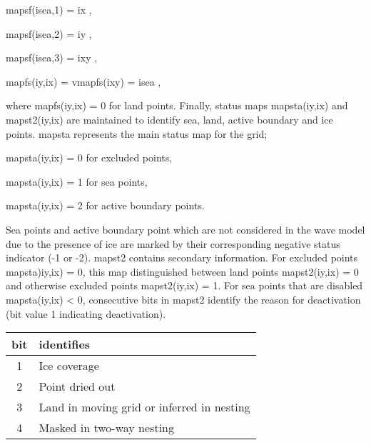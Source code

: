 \vspace{\baselineskip}
\centerline{\F mapsf(isea,1) = ix ,}
\centerline{\F mapsf(isea,2) = iy ,}
\centerline{\F mapsf(isea,3) = ixy ,}
\centerline{\F mapfs(iy,ix) = vmapfs(ixy) = isea ,}
\vspace{\baselineskip}




\noindent
where {\F mapfs(iy,ix) = 0} for land points. Finally, status maps {\F
mapsta(iy,ix)} and {\F mapst2(iy,ix)} are maintained to identify sea, land,
active boundary and ice points. {\F mapsta} represents the main status
map for the grid;

\vspace{\baselineskip} \noindent
\strut \hspace{25mm} {\F mapsta(iy,ix) = 0} \hspace{10mm} for excluded points, \\
\strut \hspace{25mm} {\F mapsta(iy,ix) = 1} \hspace{10mm} for sea points, \\
\strut \hspace{25mm} {\F mapsta(iy,ix) = 2} \hspace{10mm} for active boundary points.

\vspace{\baselineskip}

Sea points and active boundary point which are not considered in the wave
model due to the presence of ice are marked by their corresponding negative
status indicator (-1 or -2). {\F mapst2} contains secondary information. For
excluded points {\F mapsta)iy,ix) = 0}, this map distinguished between land
points {\F mapst2(iy,ix) = 0} and otherwise excluded points {\F mapst2(iy,ix)
= 1}. For sea points that are disabled {\F mapsta(iy,ix) < 0}, consecutive
bits in {\F mapst2} identify the reason for deactivation (bit value 1
indicating deactivation).

\begin{center} \begin{tabular}{cl}
 bit & identifies \\ \hline
  1  & Ice coverage     \\
  2  & Point dried out  \\
  3  & Land in moving grid or inferred in nesting \\
  4  & Masked in two-way nesting
\end{tabular} \end{center}


